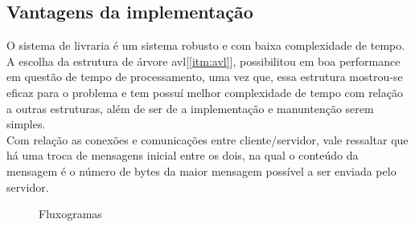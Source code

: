 \documentclass[a4paper,10pt]{article}
\begin{document}
\subsection{Vantagens da implementação}
O sistema de livraria é um sistema robusto e com baixa complexidade de tempo.
A escolha da estrutura de árvore avl[\ref{itm:avl}], possibilitou em boa 
performance em questão de tempo de processamento, uma vez que, essa estrutura
mostrou-se eficaz para o problema e tem possuí melhor complexidade de tempo com 
relação a outras estruturas, além de ser de a implementação e manuntenção serem
simples.
\\ Com relação as conexões e comunicações entre cliente/servidor, vale ressaltar que há uma troca de mensagens inicial entre os dois, na qual o conteúdo da mensagem
é o número de bytes da maior mensagem possível a ser enviada pelo servidor.
\begin{figure}[!htb]
  \centering
  \quad %
   \caption{Fluxogramas}
   \label{figfluxos}
\end{figure}
\end{document}
